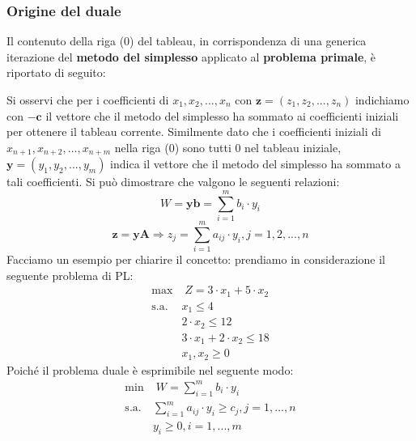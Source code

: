 \documentclass[12pt]{article}
\begin{document}
\subsubsection{Origine del duale}
Il contenuto della riga (0) del tableau, in corrispondenza di una generica iterazione del \textbf{metodo del simplesso} applicato al \textbf{problema primale}, è riportato di seguito:
\begin{center}
\end{center}
Si osservi che per i coefficienti di $x_1, x_2, ..., x_n$ con $\boldsymbol{z} = (z_1, z_2, ..., z_n)$ indichiamo con $-\boldsymbol{c}$ il vettore che il metodo del simplesso
ha sommato ai coefficienti iniziali per ottenere il tableau corrente.
Similmente dato che i coefficienti iniziali di $x_{n+1}, x_{n+2}, ..., x_{n+m}$ nella riga (0) sono tutti 0 nel tableau iniziale,
$\boldsymbol{y} = (y_1, y_2, ..., y_m)$ indica il vettore che il metodo del simplesso ha sommato a tali coefficienti.
Si può dimostrare che valgono le seguenti relazioni:
$$W = \boldsymbol{y}\boldsymbol{b} = \sum_{i=1}^m b_i \cdot y_i$$
$$\boldsymbol{z} = \boldsymbol{y}\boldsymbol{A} \Rightarrow z_j = \sum_{i=1}^m a_{ij} \cdot y_i, j = 1,2,...,n$$
Facciamo un esempio per chiarire il concetto: prendiamo in considerazione il seguente problema di PL:
\begin{equation*}
    \begin{array}{ll}
        \displaystyle \textrm{max} & \; Z = 3 \cdot x_1 + 5 \cdot x_2\\
        \textrm{s.a.} & x_1 \leq 4\\
        \phantom{} & 2 \cdot x_2 \leq 12\\
        \phantom{} & 3 \cdot x_1 + 2 \cdot x_2 \leq 18 \\
        \phantom{} & x_1,x_2 \geq 0
    \end{array}
\end{equation*}
Poiché il problema duale è esprimibile nel seguente modo:
\begin{equation*}
    \begin{array}{ll}
        \displaystyle \textrm{min} & \; W = \sum_{i=1}^m b_i \cdot y_i\\
        \textrm{s.a.} & \sum_{i=1}^m a_{ij} \cdot y_i \geq c_j, j= 1,...,n\\
        \phantom{} & y_i \geq 0, i=1,...,m
    \end{array}
\end{equation*}
\end{document}
